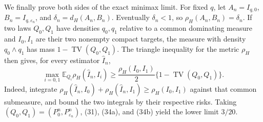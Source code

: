 We finally prove both sides of the exact minimax limit.  For fixed \(q\), let \(A_n=I_{q,0}\), \(B_n=I_{q,\varepsilon_n}\), and \(\delta_n=d_H(A_n,B_n)\).  Eventually \(\delta_n<1\), so \(\rho_H(A_n,B_n)=\delta_n\).  If two laws \(Q_0,Q_1\) have densities \(q_0,q_1\) relative to a common dominating measure and \(I_0,I_1\) are their two nonempty compact targets, the measure with density \(q_0\wedge q_1\) has mass \(1-\operatorname{TV}(Q_0,Q_1)\).  The triangle inequality for the metric \(\rho_H\) then gives, for every estimator \(\widehat I_n\),
\[
 \max_{i=0,1}\mathbb E_{Q_i}\rho_H(\widehat I_n,I_i)
 \ge\frac{\rho_H(I_0,I_1)}{2}
       \{1-\operatorname{TV}(Q_0,Q_1)\}.                         \tag{34b}
\]
Indeed, integrate \(\rho_H(\widehat I_n,I_0)+\rho_H(\widehat I_n,I_1)\ge\rho_H(I_0,I_1)\) against that common submeasure, and bound the two integrals by their respective risks.  Taking \((Q_0,Q_1)=(P_0^n,P_{\varepsilon_n}^n)\), (31), (34a), and (34b) yield the lower limit \(3/20\).


